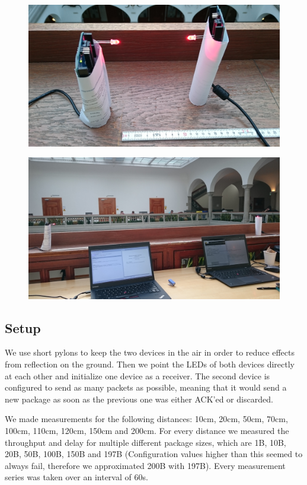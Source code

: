 \begin{figure}[htp]
\centering
\includegraphics[width=\textwidth]{../img/setup_1.JPG}
\caption{}
\label{}
\end{figure}
\begin{figure}[htp]
\centering
\includegraphics[width=\textwidth]{../img/setup_2.JPG}
\caption{}
\label{}
\end{figure}

\subsection{Setup}
We use short pylons to keep the two devices in the air in order to reduce effects from reflection on the ground.
Then we point the LEDs of both devices directly at each other and initialize one device as a receiver. The second device is configured to send as many packets as possible, meaning that it would send a new package as soon as the previous one was either ACK'ed or discarded.

We made measurements for the following distances: 10cm, 20cm, 50cm, 70cm, 100cm, 110cm, 120cm, 150cm and 200cm. For every distance we measured the throughput and delay for multiple different package sizes, which are 1B, 10B, 20B, 50B, 100B, 150B and 197B (Configuration values higher than this seemed to always fail, therefore we approximated 200B with 197B). Every measurement series was taken over an interval of 60s.


